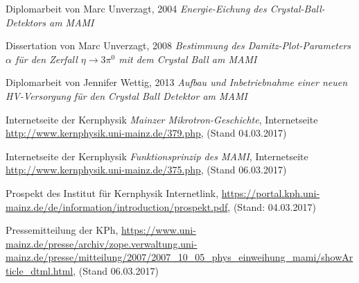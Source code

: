 \documentclass[a4paper,11pt,oneside,final,german,openbib,pdftex]{scrbook}
\begin{document}
\begin{appendix}



\renewcommand{\bibname}{\bfont Literaturverzeichnis} 

\begin{thebibliography}{99}
	
 Diplomarbeit von Marc Unverzagt, 2004 {\em Energie-Eichung des Crystal-Ball-Detektors am MAMI}

 Dissertation von Marc Unverzagt, 2008 {\em Bestimmung des Damitz-Plot-Parameters $\alpha$ für den Zerfall $ \eta \rightarrow 3\pi^{0} $ mit dem Crystal Ball am MAMI}

 Diplomarbeit von Jennifer Wettig, 2013 {\em Aufbau und Inbetriebnahme einer neuen HV-Versorgung für den Crystal Ball Detektor am MAMI}

 Internetseite der Kernphysik {\em Mainzer Mikrotron-Geschichte}, Internetseite \url{http://www.kernphysik.uni-mainz.de/379.php}, (Stand 04.03.2017)

 Internetseite der Kernphysik {\em Funktionsprinzip des MAMI}, Internetseite \url{http://www.kernphysik.uni-mainz.de/375.php}, (Stand 06.03.2017)

 Prospekt des Institut für Kernphysik Internetlink, \url{https://portal.kph.uni-mainz.de/de/information/introduction/prospekt.pdf}, (Stand: 04.03.2017)

 Pressemitteilung der KPh, \url{https://www.uni-mainz.de/presse/archiv/zope.verwaltung.uni-mainz.de/presse/mitteilung/2007/2007_10_05_phys_einweihung_mami/showArticle_dtml.html}, (Stand 06.03.2017)


\end{thebibliography}
\end{appendix}
\end{document}
